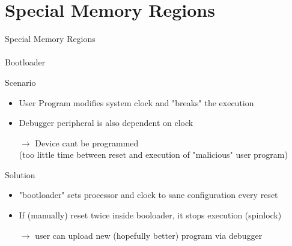 \documentclass[aspectratio=169]{CPS-Beamer}
\begin{document}
\section{Special Memory Regions}
\begin{frame}{Special Memory Regions\\~\\Bootloader}
	\begin{block}{Scenario}
		\begin{itemize}
			\item User Program modifies system clock and "breaks" the execution
			\item Debugger peripheral is also dependent on clock
			\item[$\rightarrow$] Device cant be programmed\\(too little time between reset and execution of "malicious" user program)
		\end{itemize}
	\end{block}
	\begin{block}{Solution}
	\begin{itemize}
		\item "bootloader" sets processor and clock to sane configuration every reset
		\item If (manually) reset twice inside booloader, it stops execution (spinlock)
		\item[$\rightarrow$] user can upload new (hopefully better) program via debugger
	\end{itemize}
\end{block}
\end{frame}
\end{document}
